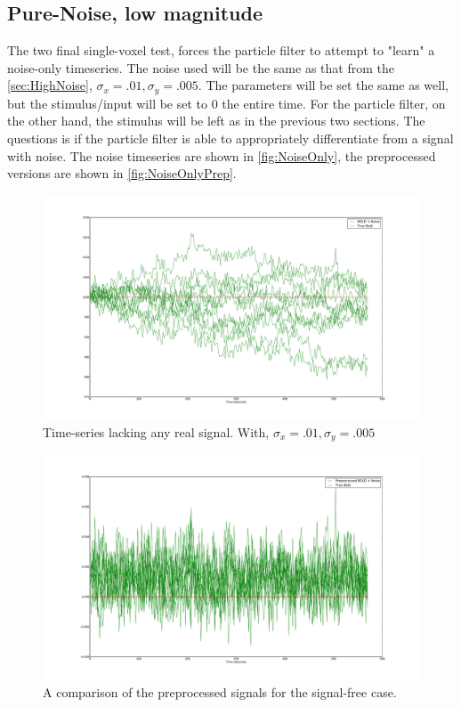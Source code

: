 \subsection{Pure-Noise, low magnitude}
The two final single-voxel test, forces the particle filter to attempt to "learn" a noise-only
timeseries. The noise used will be the same as that from the \autoref{sec:HighNoise},
$\sigma_x = .01, \sigma_y = .005$. The parameters will be set the same as well, but the
stimulus/input will be set to 0 the entire time. For the particle filter, on the other hand,
the stimulus will be left as in the previous two sections. The questions is if the particle
filter is able to appropriately differentiate from a signal with noise. The noise timeseries
are shown in \autoref{fig:NoiseOnly}, the preprocessed versions are shown in \autoref{fig:NoiseOnlyPrep}.
\begin{figure}[H]
\label{fig:NoiseOnly}
\includegraphics[trim=6cm 3cm 6cm 3cm,width=16cm]{images/realization_noiseonly}
\caption{Time-series lacking any real signal. With, $\sigma_x = .01, \sigma_y=.005$}
\end{figure}
\begin{figure}[H]
\label{fig:PreprocessedNoiseOnly}
\includegraphics[trim=6cm 3cm 6cm 3cm,width=16cm]{images/preprocessed_noiseonly}
\caption{A comparison of the preprocessed signals for the signal-free case.}
\end{figure}

